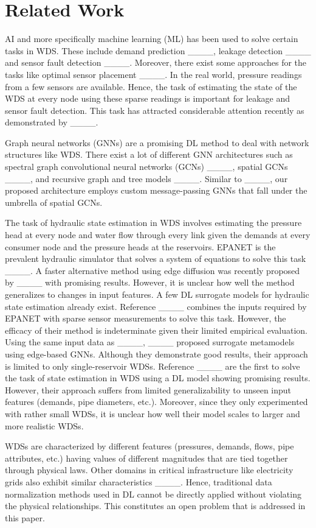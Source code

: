 \section{Related Work}
AI and more specifically machine learning (ML) has been used to solve certain tasks in WDS. These include demand prediction ____, leakage detection ____ and sensor fault detection ____. Moreover, there exist some approaches for the tasks like optimal sensor placement ____. In the real world, pressure readings from a few sensors are available. Hence, the task of estimating the state of the WDS at every node using these sparse readings is important for leakage and sensor fault detection. This task has attracted considerable attention recently as demonstrated by ____.

Graph neural networks (GNNs) are a promising DL method to deal with network structures like WDS. There exist a lot of different GNN architectures such as spectral graph convolutional neural networks (GCNs) ____, spatial GCNs ____, and recursive graph and tree models  ____. Similar to ____, our proposed architecture employs custom message-passing GNNs that fall under the umbrella of spatial GCNs. 

The task of hydraulic state estimation in WDS involves estimating the pressure head at every node and water flow through every link given the demands at every consumer node and the pressure heads at the reservoirs. EPANET is the prevalent hydraulic simulator that solves a system of equations to solve this task ____. A faster alternative method using edge diffusion was recently proposed by ____ with promising results. However, it is unclear how well the method generalizes to changes in input features. A few DL surrogate models for hydraulic state estimation already exist. Reference ____ combines the inputs required by EPANET with sparse sensor measurements to solve this task. However, the efficacy of their method is indeterminate given their limited empirical evaluation. Using the same input data as ____, ____ proposed surrogate metamodels using edge-based GNNs. Although they demonstrate good results, their approach is limited to only single-reservoir WDSs. Reference ____ are the first to solve the task of state estimation in WDS using a DL model showing promising results. However, their approach suffers from limited generalizability to unseen input features (demands, pipe diameters, etc.). Moreover, since they only experimented with rather small WDSs, it is unclear how well their model scales to larger and more realistic WDSs. 

WDSs are characterized by different features (pressures, demands, flows, pipe attributes, etc.) having values of different magnitudes that are tied together through physical laws. Other domains in critical infrastructure like electricity grids also exhibit similar characteristics ____. Hence, traditional data normalization methods used in DL cannot be directly applied without violating the physical relationships. This constitutes an open problem that is addressed in this paper.